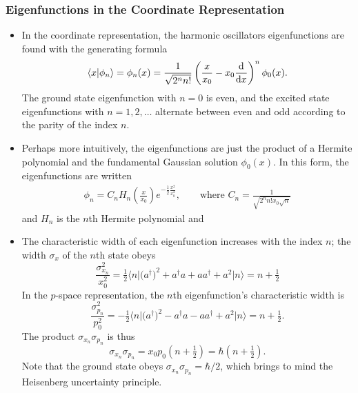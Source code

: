 \documentclass[11pt, a4paper]{article}
\newcommand{\bmel}[3]{\big \langle {#1} \big | {#2} \big | {#3} \big \rangle}  %
\begin{document}
\subsubsection{Eigenfunctions in the Coordinate Representation}
\begin{itemize}
	\item In the coordinate representation, the harmonic oscillators eigenfunctions are found with the generating formula
	\begin{equation*}
		\braket{x}{\phi_{n}} = \phi_{n}(x) = \frac{1}{\sqrt{2^{n}n!}}\left(\frac{x}{x_{0}} - x_{0} \dv{x}\right)^{n}\phi_{0}(x).
	\end{equation*}
	The ground state eigenfunction with $ n = 0 $ is even, and the excited state eigenfunctions with $ n = 1, 2, \ldots $ alternate between even and odd according to the parity of the index $ n $. 
	
	\item Perhaps more intuitively, the eigenfunctions are just the product of a Hermite polynomial and the fundamental Gaussian solution $ \phi_{0}(x) $. In this form, the eigenfunctions are written
	\begin{align*}
		\phi_{n} = C_{n} H_{n}\left(\frac{x}{x_{0}}\right)e^{-\frac{1}{2}\frac{x^{2}}{x_{0}^{2}}}, \qquad \text{where } C_{n} = \frac{1}{\sqrt{2^{n}n!x_{0} \sqrt{n}}}
	\end{align*}
	and $ H_{n} $ is the $ n $th Hermite polynomial and
	
	\item The characteristic width of each eigenfunction increases with the index $ n $; the width $ \sigma_{x} $ of the $ n $th state obeys
	\begin{equation*}
		\frac{\sigma_{x_{n}}^{2}}{x_{0}^{2}} = \tfrac{1}{2}\bmel{n}{\big(a^{\dagger}\big)^{2} + a^{\dagger}a + aa^{\dagger} + a^{2}}{n} = n + \tfrac{1}{2}
	\end{equation*}
	In the $ p $-space representation, the $ n $th eigenfunction's characteristic width is
	\begin{equation*}
		\frac{\sigma^{2}_{p_{n}}}{p_{0}^{2}} = - \tfrac{1}{2} \bmel{n}{\big(a^{\dagger}\big)^{2} - a^{\dagger}a - aa^{\dagger} + a^{2}}{n} = n + \tfrac{1}{2}.
	\end{equation*}
	The product $ \sigma_{x_{n}}\sigma_{p_{n}} $ is thus
	\begin{equation*}
        \sigma_{x_{n}}\sigma_{p_{n}} = x_{0} p_{0} \left(n + \tfrac{1}{2}\right) = \hbar\left(n + \tfrac{1}{2}\right).
	\end{equation*}
	Note that the ground state obeys $ \sigma_{x_{n}}\sigma_{p_{n}} = \hbar/2 $, which brings to mind the Heisenberg uncertainty principle.
	
	
\end{itemize}
	
\end{document}
